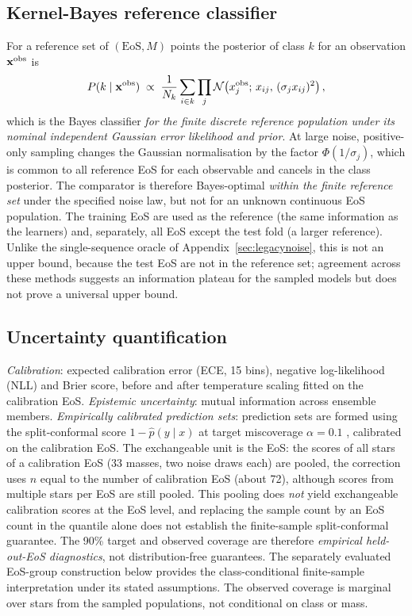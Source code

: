 \documentclass[11pt,a4paper]{article}
\begin{document}
\subsection{Kernel-Bayes reference classifier}
For a reference set of $(\mathrm{EoS},M)$ points the posterior of class $k$ for an observation $\mathbf x^{\rm obs}$ is
\begin{equation}
P(k\mid\mathbf x^{\rm obs})\;\propto\;\frac1{N_k}\sum_{i\in k}\prod_j\mathcal N\!\left(x^{\rm obs}_j;\,x_{ij},\,(\sigma_jx_{ij})^2\right),
\end{equation}
which is the Bayes classifier \emph{for the finite discrete reference population under its nominal independent Gaussian error likelihood and prior}. At large noise, positive-only sampling changes the Gaussian normalisation by the factor $\Phi(1/\sigma_j)$, which is common to all reference EoS for each observable and cancels in the class posterior. The comparator is therefore Bayes-optimal \emph{within the finite reference set} under the specified noise law, but not for an unknown continuous EoS population. The training EoS are used as the reference (the same information as the learners) and, separately, all EoS except the test fold (a larger reference). Unlike the single-sequence oracle of Appendix~\ref{sec:legacynoise}, this is not an upper bound, because the test EoS are not in the reference set; agreement across these methods suggests an information plateau for the sampled models but does not prove a universal upper bound.

\subsection{Uncertainty quantification}\label{sec:uncmethods}
\emph{Calibration}: expected calibration error (ECE, 15 bins), negative log-likelihood (NLL) and Brier score, before and after temperature scaling fitted on the calibration EoS. \emph{Epistemic uncertainty}: mutual information across ensemble members. \emph{Empirically calibrated prediction sets}: prediction sets are formed using the split-conformal score $1-\hat p(y\mid x)$ at target miscoverage $\alpha=0.1$ \citep{Vovk05,Angelopoulos23}, calibrated on the calibration EoS. The exchangeable unit is the EoS: the scores of all stars of a calibration EoS (33 masses, two noise draws each) are pooled, the correction uses $n$ equal to the number of calibration EoS (about 72), although scores from multiple stars per EoS are still pooled. This pooling does \emph{not} yield exchangeable calibration scores at the EoS level, and replacing the sample count by an EoS count in the quantile alone does not establish the finite-sample split-conformal guarantee. The 90\% target and observed coverage are therefore \emph{empirical held-out-EoS diagnostics}, not distribution-free guarantees. The separately evaluated EoS-group construction below provides the class-conditional finite-sample interpretation under its stated assumptions. The observed coverage is marginal over stars from the sampled populations, not conditional on class or mass.
\end{document}
